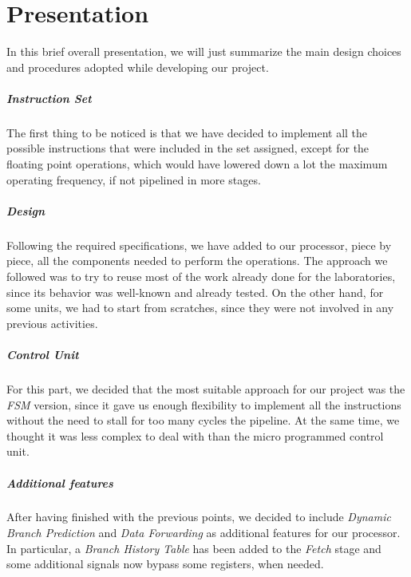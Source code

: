 \chapter{Presentation}
\label{chap_intro}

In this brief overall presentation, we will just summarize the main design choices and procedures adopted while developing our project.

\paragraph{Instruction Set}
The first thing to be noticed is that we have decided to implement all the possible instructions that were included in the set assigned, except for the floating point operations, which would have lowered down a lot the maximum operating frequency, if not pipelined in more stages.

\paragraph{Design}
Following the required specifications, we have added to our processor, piece by piece, all the components needed to perform the operations. The approach we followed was to try to reuse most of the work already done for the laboratories, since its behavior was well-known and already tested. On the other hand, for some units, we had to start from scratches, since they were not involved in any previous activities.

\paragraph{Control Unit}
For this part, we decided that the most suitable approach for our project was the \textit{FSM} version, since it gave us enough flexibility to implement all the instructions without the need to stall for too many cycles the pipeline. At the same time, we thought it was less complex to deal with than the micro programmed control unit.

\paragraph{Additional features}
After having finished with the previous points, we decided to include \textit{Dynamic Branch Prediction} and \textit{Data Forwarding} as additional features for our processor. In particular, a \textit{Branch History Table} has been added to the \textit{Fetch} stage and some additional signals now bypass some registers, when needed.

